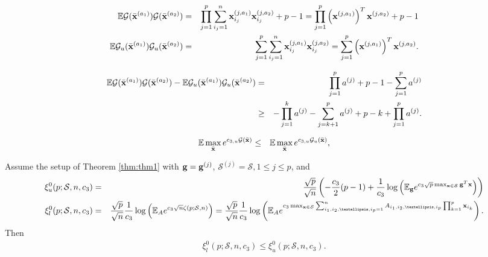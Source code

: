 \documentclass[10pt,a4paper]{amsart}
\def\cG{{\mathcal G}}
\def\cS{{\mathcal S}}
\def\g{{\bf g}}
\def\lp{\left (}
\def\mE{{\mathbb E}}
\def\rp{\right )}
\def\x{{\bf x}}
\begin{document}
  \begin{eqnarray}
\label{eq:mr2}
\mE \cG (\bar{\x}^{(a_1)})\cG (\bar{\x}^{(a_2)} )   & =  & \prod_{j=1}^{p}  \sum_{i_j=1}^n   \x_{i_j}^{(j,a_1)}  \x_{i_j}^{(j,a_2)}  + p-1
=  \prod_{j=1}^{p}  \lp \x^{(j,a_1)} \rp^T\x^{(j,a_2)}  + p-1 \nonumber   \\
\mE \cG_u (\bar{\x}^{(a_1)})\cG_u (\bar{\x}^{(a_2)} )   & =  & \sum_{j=1}^p \sum_{i_j=1}^n \x_{i_j}^{(j,a_1)}\x_{i_j}^{(j,a_2)}
=
\sum_{j=1}^p
 \lp \x^{(j,a_1)} \rp^T\x^{(j,a_2)}.
  \end{eqnarray}

 \begin{eqnarray}
\label{eq:mr3}
  \mE \cG (\bar{\x}^{(a_1)})\cG (\bar{\x}^{(a_2)} )
 -
\mE \cG_u (\bar{\x}^{(a_1)})\cG_u (\bar{\x}^{(a_2)} )
 & =  &
  \prod_{j=1}^{p} a^{(j)}  + p-1
-\sum_{j=1}^p
 a^{(j)}
   \nonumber \\
& \geq &  - \prod_{j=1}^{k} a^{(j)} -\sum_{j=k+1}^p
 a^{(j)}
 + p-k  +  \prod_{j=1}^{p} a^{(j)}.
  \end{eqnarray}

\begin{eqnarray}
\label{eq:mr6}
  \mE \max_{\bar{\x}} e^{c_{3,u}\cG(\bar{\x})} &\leq &   \mE \max_{\bar{\x}} e^{c_{3,u}\cG_u(\bar{\x})},
\end{eqnarray}

\begin{corollary}
\label{cor:cor2}
Assume the setup of Theorem \ref{thm:thm1} with $\g=\g^{(j)}$, $\cS^{(j)}=\cS,1\leq j\leq p$, and
 \begin{eqnarray}
   \label{eq:cor2eq1}
 \xi_u^0(p;\cS,n,c_3) & = & \frac{\sqrt{p}}{\sqrt{n}} \lp -\frac{c_{3}}{2}(p-1)  + \frac{1}{c_{3}} \log\lp  \mE_{\g} e^{c_{3}\sqrt{p}\max_{\x\in\cS} \g^T\x } \rp \rp
\nonumber \\
\xi_l^0(p;\cS,n,c_3) & = &  \frac{\sqrt{p}}{\sqrt{n}} \frac{1}{c_{3}} \log \lp \mE_{A} e^{ c_{3}  \sqrt{n}     \zeta (p;\cS,n)  } \rp  =  \frac{\sqrt{p}}{\sqrt{n}} \frac{1}{c_{3}} \log \lp \mE_{A} e^{ c_{3} \max_{\x\in\cS }  \sum_{i_1,i_2,\dots,i_p=1}^n A_{i_1,i_2,\dots,i_p}\prod_{k=1}^{p}\x_{i_k}
 } \rp.\nonumber \\
 \end{eqnarray}
Then
\begin{eqnarray}
   \label{eq:cor2eq2}
\xi^0_l(p;\cS,n,c_{3})  \leq  \xi^0_u(p;\cS,n,c_{3}).
\end{eqnarray}
\end{corollary}
\end{document}
